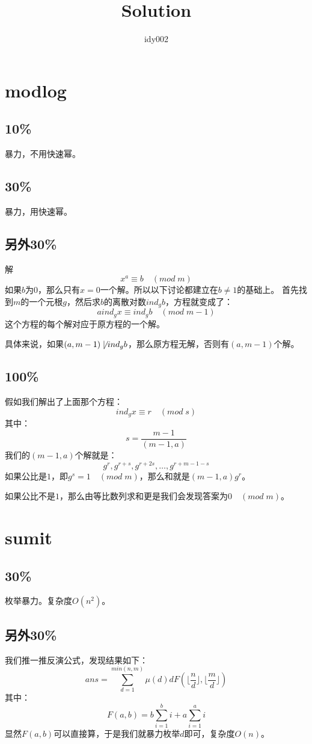 \documentclass[10pt,a4paper,twoside]{article}
\author{idy002}
\title{Solution}
\begin{document}
	\maketitle
	
	\newpage
	\section{modlog}
		\subsection{10\%}
			暴力，不用快速幂。
		\subsection{30\%}
			暴力，用快速幂。
		\subsection{另外30\%}
			解
			$$
				x^a \equiv b \quad (mod \; m)
			$$
			如果$b$为$0$，那么只有$x = 0$一个解。所以以下讨论都建立在$b \not= 1$的基础上。
			首先找到$m$的一个元根$g$，然后求$b$的离散对数$ind_gb$，方程就变成了：
			$$
				aind_gx \equiv ind_gb \quad (mod \; m - 1)
			$$
			这个方程的每个解对应于原方程的一个解。
			
			具体来说，如果$(a,m-1) \not\mid ind_gb$，那么原方程无解，否则有$(a,m-1)$个解。
			 
		\subsection{100\%}
			假如我们解出了上面那个方程：
			$$
				ind_gx \equiv r \quad(mod \; s)
			$$
			其中：
			$$
				s = \frac{m-1}{(m-1,a)}
			$$
			我们的$(m-1,a)$个解就是：
			$$
				g^{r}, g^{r+s}, g^{r+2s},\dots,g^{r+m-1-s}
			$$
			如果公比是$1$，即$g^s = 1 \quad (mod \; m)$，那么和就是$(m-1,a)g^r$。
			
			如果公比不是$1$，那么由等比数列求和更是我们会发现答案为$0 \quad (mod \; m)$。
	\newpage
	\section{sumit}
		\subsection{30\%}
			枚举暴力。复杂度$O(n^2)$。
		\subsection{另外30\%}
			我们推一推反演公式，发现结果如下：
			$$
				ans = \sum_{d = 1}^{min(n,m)} \mu(d) d F(\lfloor \frac{n}{d} \rfloor, \lfloor \frac{m}{d} \rfloor)
			$$
			其中：
			$$
				F(a,b) = b\sum_{i = 1}^{b}i + a\sum_{i = 1}^{a}i
			$$
			显然$F(a,b)$可以直接算，于是我们就暴力枚举$d$即可，复杂度$O(n)$。
			
\end{document}
